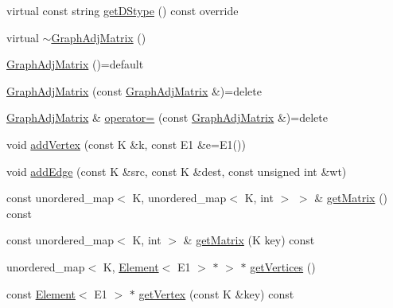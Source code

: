 \begin{DoxyCompactItemize}
\item 
virtual const string \hyperlink{classbridges_1_1datastructure_1_1_graph_adj_matrix_a2f8c67da1078354156fc646097152c6d}{get\+D\+Stype} () const override
\item 
virtual \hyperlink{classbridges_1_1datastructure_1_1_graph_adj_matrix_ad4715c14dccce7f40fb91f8d31c9e55b}{$\sim$\+Graph\+Adj\+Matrix} ()
\item 
\hyperlink{classbridges_1_1datastructure_1_1_graph_adj_matrix_a43d51f3dcb175767b28555494eb3aee1}{Graph\+Adj\+Matrix} ()=default
\item 
\hyperlink{classbridges_1_1datastructure_1_1_graph_adj_matrix_a08f3ae1748d5eeb88fa2d99c8427e534}{Graph\+Adj\+Matrix} (const \hyperlink{classbridges_1_1datastructure_1_1_graph_adj_matrix}{Graph\+Adj\+Matrix} \&)=delete
\item 
\hyperlink{classbridges_1_1datastructure_1_1_graph_adj_matrix}{Graph\+Adj\+Matrix} \& \hyperlink{classbridges_1_1datastructure_1_1_graph_adj_matrix_a6203e8d0b6feabdbd1b7ea0619dbe063}{operator=} (const \hyperlink{classbridges_1_1datastructure_1_1_graph_adj_matrix}{Graph\+Adj\+Matrix} \&)=delete
\item 
void \hyperlink{classbridges_1_1datastructure_1_1_graph_adj_matrix_aaebb2607d06b1c36548652dba0211744}{add\+Vertex} (const K \&k, const E1 \&e=E1())
\item 
void \hyperlink{classbridges_1_1datastructure_1_1_graph_adj_matrix_ab23870ac203b3784157ecb05443494a4}{add\+Edge} (const K \&src, const K \&dest, const unsigned int \&wt)
\item 
const unordered\+\_\+map$<$ K, unordered\+\_\+map$<$ K, int $>$ $>$ \& \hyperlink{classbridges_1_1datastructure_1_1_graph_adj_matrix_aaf5c1ae5267b7ff4c8fcc861221ff2e8}{get\+Matrix} () const
\item 
const unordered\+\_\+map$<$ K, int $>$ \& \hyperlink{classbridges_1_1datastructure_1_1_graph_adj_matrix_a0b49749793278a1910dd5ea67dbaeacf}{get\+Matrix} (K key) const
\item 
unordered\+\_\+map$<$ K, \hyperlink{classbridges_1_1datastructure_1_1_element}{Element}$<$ E1 $>$ $\ast$ $>$ $\ast$ \hyperlink{classbridges_1_1datastructure_1_1_graph_adj_matrix_a4bcf803c43af2f14224a0891b9260fbf}{get\+Vertices} ()
\item 
const \hyperlink{classbridges_1_1datastructure_1_1_element}{Element}$<$ E1 $>$ $\ast$ \hyperlink{classbridges_1_1datastructure_1_1_graph_adj_matrix_a3de2ef8ce16e0c0d2240a92838ffd8aa}{get\+Vertex} (const K \&key) const

\end{DoxyCompactItemize}
